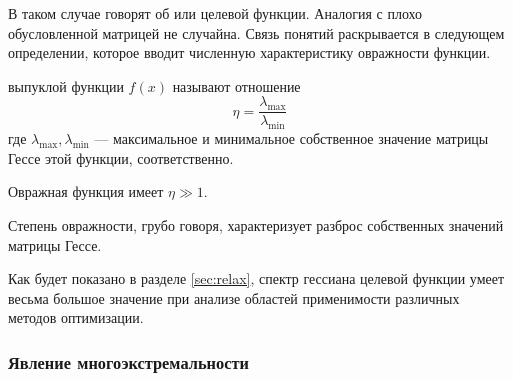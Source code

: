 В таком случае говорят об  или  целевой функции. Аналогия с плохо обусловленной
матрицей не случайна. Связь понятий раскрывается в следующем
определении, которое вводит численную характеристику овражности
функции.

\begin{dfn}
  \label{dfn:ill-cond}
   выпуклой функции $f(x)$ называют
  отношение
  \begin{equation*}
    \eta = \frac{\lambda_{\max}}{\lambda_{\min}}
  \end{equation*}
  где $\lambda_{\max}, \lambda_{\min}$ — максимальное и минимальное
  собственное значение матрицы Гессе этой функции, соответственно.
\end{dfn}

Овражная функция имеет $\eta \gg 1$.

Степень овражности, грубо говоря, характеризует разброс собственных
значений матрицы Гессе. 

Как будет показано в разделе \ref{sec:relax}, спектр гессиана целевой
функции умеет весьма большое значение при анализе областей
применимости различных методов оптимизации.

\subsubsection{Явление многоэкстремальности}

